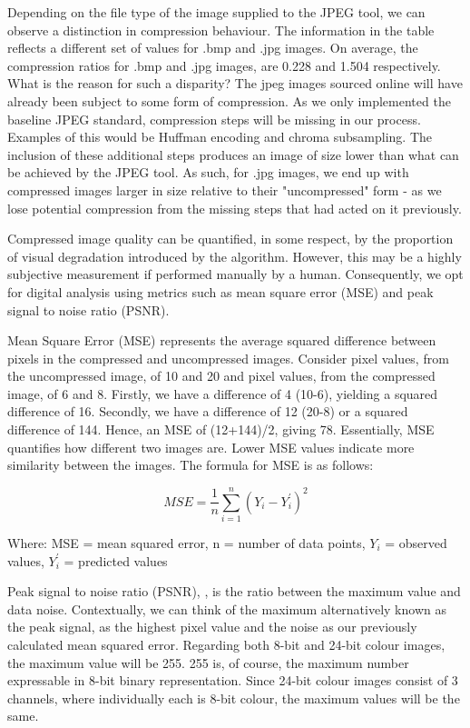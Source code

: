 \documentclass{l4proj}
\begin{document}
Depending on the file type of the image supplied to the JPEG tool, we can observe a distinction in compression behaviour. The information in the table reflects a different set of values for .bmp and .jpg images. On average, the compression ratios for .bmp and .jpg images, are 0.228 and 1.504 respectively. What is the reason for such a disparity? The jpeg images sourced online will have already been subject to some form of compression. As we only implemented the baseline JPEG standard, compression steps will be missing in our process. Examples of this would be Huffman encoding and chroma subsampling. The inclusion of these additional steps produces an image of size lower than what can be achieved by the JPEG tool. As such, for .jpg images, we end up with compressed images larger in size relative to their "uncompressed" form - as we lose potential compression from the missing steps that had acted on it previously. 

Compressed image quality can be quantified, in some respect, by the proportion of visual degradation introduced by the algorithm. However, this may be a highly subjective measurement if performed manually by a human. Consequently, we opt for digital analysis using metrics such as mean square error (MSE) and peak signal to noise ratio (PSNR).

Mean Square Error (MSE) represents the average squared difference between pixels in the compressed and uncompressed images. Consider pixel values, from the uncompressed image, of 10 and 20 and pixel values, from the compressed image, of 6 and 8. Firstly, we have a difference of 4 (10-6), yielding a squared difference of 16. Secondly, we have a difference of 12 (20-8) or a squared difference of 144. Hence, an MSE of (12+144)/2, giving 78. Essentially, MSE quantifies how different two images are. Lower MSE values indicate more similarity between the images. The formula for MSE \citep{mseexplanation} is as follows:


\[MSE = \frac{1}{n}\sum_{i=1}^{n}(Y_{i}-Y^{'}_i ) ^2\]

Where: MSE = mean squared error, n = number of data points, \(Y_{i}\) = observed values, \(Y^{'}_i\) = predicted values


Peak signal to noise ratio (PSNR), \citep{psnrform}, is the ratio between the maximum value and data noise. Contextually, we can think of the maximum alternatively known as the peak signal, as the highest pixel value and the noise as our previously calculated mean squared error. Regarding both 8-bit and 24-bit colour images, the maximum value will be 255. 255 is, of course, the maximum number expressable in 8-bit binary representation. Since 24-bit colour images consist of 3 channels, where individually each is 8-bit colour, the maximum values will be the same.
\end{document}
